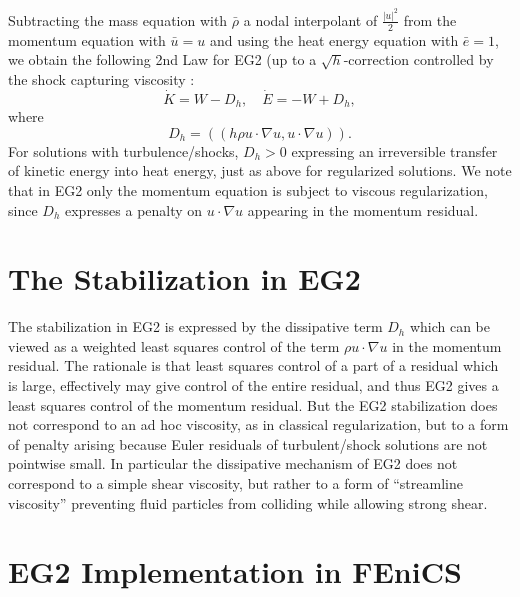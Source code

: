 Subtracting the mass equation with 
$\bar\rho$ a nodal interpolant 
of $\frac{\vert u\vert^2}{2}$ 
from the momentum equation
with  $\bar u=u$ and using the heat energy equation with $\bar e=1$, we obtain
the following 2nd Law for EG2 (up to a $\sqrt{h}$-correction controlled
by the shock capturing viscosity \cite{johnsonconslaw}: 
\begin{equation}\label{2ndlawEG2}
\dot K = W-D_h,\quad \dot E=-W+D_h,
\end{equation}
where 
\begin{equation}\label{tur_disp}
D_h=((h\rho u\cdot\nabla u,u\cdot\nabla u)).
\end{equation}
For solutions with turbulence/shocks, $D_h>0$ expressing an irreversible
transfer of kinetic energy into heat energy, just as above for regularized
solutions. We note that in EG2 only the momentum equation is
subject to viscous regularization, since $D_h$ expresses a 
penalty on $u\cdot\nabla u$ appearing in the momentum residual.  

\section{The Stabilization in EG2}

The stabilization in EG2 is expressed by the dissipative term $D_h$ 
which can be viewed as a weighted least squares control
of the term $\rho u\cdot\nabla u$ in the momentum residual.
The rationale is that least squares control of a  
part of a residual which is large, effectively may 
give control of the entire residual, and thus EG2 
gives a least squares control of the 
momentum residual. But the EG2 stabilization does not correspond
to an ad hoc viscosity, as in classical regularization, but to
a form of penalty arising because Euler residuals 
of turbulent/shock solutions are not pointwise small. In particular
the dissipative mechanism of EG2 does not correspond to a
simple shear viscosity, but rather to a form of ``streamline viscosity''
preventing fluid particles from colliding while allowing strong shear. 

\section{EG2 Implementation in FEniCS}

